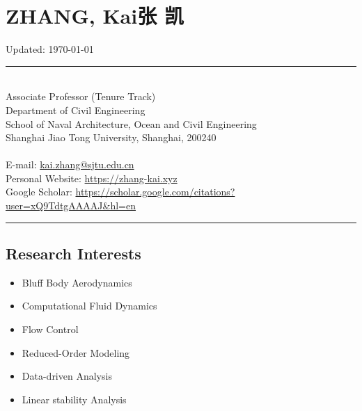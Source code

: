 \documentclass[10pt]{article}
\newenvironment{myitemize}
{ \begin{itemize}
    \setlength{\itemsep}{0pt}
    \setlength{\parskip}{0pt}
    \setlength{\parsep}{0pt}     }
{ \end{itemize}                  }
\begin{document}
\section*{{\huge ZHANG, Kai\quad 张 凯}} 

\vspace{-0.6in}
\null\hfill {\scriptsize Updated:   \today}

\begin{center}
\rule{\textwidth}{0.5pt}
\end{center}
\vspace{-0.34in}
~\\

\noindent Associate Professor (Tenure Track)\\ 
Department of Civil Engineering\\
School of Naval Architecture, Ocean and Civil Engineering\\
Shanghai Jiao Tong University, Shanghai, 200240\\
~\\
E-mail: \href{kai.zhang@sjtu.edu.cn}{kai.zhang@sjtu.edu.cn}\\
Personal Website: \href{https://zhang-kai.xyz}{https://zhang-kai.xyz} \\
Google Scholar: \href{https://scholar.google.com/citations?user=xQ9TdtgAAAAJ&hl=en}{https://scholar.google.com/citations?user=xQ9TdtgAAAAJ\&hl=en}\\

\vspace{-0.34in}
\begin{center}
\rule{\textwidth}{0.5pt}
\end{center}

\subsection*{Research Interests}

\begin{multicols}{2}
\begin{myitemize}
\item Bluff Body Aerodynamics
\item Computational Fluid Dynamics
\item Flow Control
\item Reduced-Order Modeling
\item Data-driven Analysis
\item Linear stability Analysis


\end{myitemize}
\end{multicols}
\end{document}

